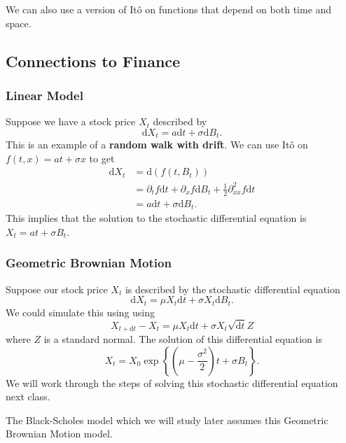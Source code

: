 We can also use a version of It\^{o} on functions that depend on both time and space. 

\subsection{Connections to Finance}
\subsubsection{Linear Model}
Suppose we have a stock price $X_t$ described by $$ \mathrm dX_t = a\mathrm dt + \sigma\mathrm dB_t. $$ This is an example of a \textbf{random walk with drift}. We can use It\^{o} on $f(t,x) = at + \sigma x$ to get \begin{align*}
	\mathrm dX_t &= \mathrm d(f(t,B_t)) \\
				 &= \partial_t f\mathrm dt + \partial_x f\mathrm dB_t + \frac{1}{2}\partial_{xx}^2 f\mathrm dt \\
				 &= a\mathrm dt + \sigma\mathrm dB_t.
\end{align*} This implies that the solution to the stochastic differential equation is $X_t = at + \sigma B_t$.

\subsubsection{Geometric Brownian Motion}
Suppose our stock price $X_t$ is described by the stochastic differential equation $$ \mathrm dX_t = \mu X_t \mathrm dt + \sigma X_t \mathrm dB_t. $$ We could simulate this using using $$ X_{t+\mathrm dt} - X_t = \mu X_t \mathrm dt + \sigma X_t \sqrt{\mathrm dt} Z $$ where $Z$ is a standard normal. The solution of this differential equation is $$ X_t = X_0 \exp \left\{ \left( \mu-\frac{\sigma^2}{2} \right) t + \sigma B_t \right\}. $$ We will work through the steps of solving this stochastic differential equation next class.

The Black-Scholes model which we will study later assumes this Geometric Brownian Motion model.

